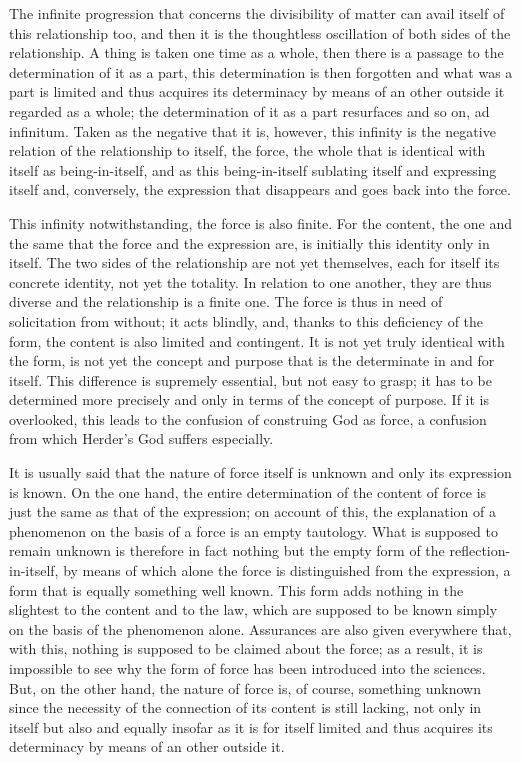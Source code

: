     The infinite progression that concerns
    the divisibility of matter
    can avail itself of this relationship too,
    and then it is the thoughtless oscillation
    of both sides of the relationship.
    A thing is taken one time as a whole,
    then there is a passage to the determination of it as a part,
    this determination is then forgotten
    and what was a part is limited and thus acquires
    its determinacy by means of an other outside it
    regarded as a whole;
    the determination of it as a part resurfaces
    and so on, ad infinitum.
    Taken as the negative that it is, however,
    this infinity is the negative relation of
    the relationship to itself, the force,
    the whole that is identical with itself as being-in-itself,
    and as this being-in-itself sublating itself and expressing itself
    and, conversely, the expression that disappears
    and goes back into the force.

    This infinity notwithstanding,
    the force is also finite.
    For the content, the one and the same
    that the force and the expression are, is
    initially this identity only in itself.
    The two sides of the relationship
    are not yet themselves,
    each for itself its concrete identity,
    not yet the totality.
    In relation to one another, they are thus diverse
    and the relationship is a finite one.
    The force is thus in need of solicitation from without;
    it acts blindly, and, thanks to this deficiency of the form,
    the content is also limited and contingent.
    It is not yet truly identical with the form,
    is not yet the concept and purpose
    that is the determinate in and for itself.
    This difference is supremely essential,
    but not easy to grasp;
    it has to be determined more precisely and
    only in terms of the concept of purpose.
    If it is overlooked, this leads to
    the confusion of construing God as force,
    a confusion from which Herder's God suffers especially.

    It is usually said that the nature of force itself is unknown
    and only its expression is known.
    On the one hand, the entire determination of the content of force is
    just the same as that of the expression;
    on account of this, the explanation of a phenomenon
    on the basis of a force is an empty tautology.
    What is supposed to
    remain unknown is therefore in fact nothing but the empty form
    of the reflection-in-itself, by means of which alone the force is
    distinguished from the expression, a form that is equally
    something well known.
    This form adds nothing in the slightest to the content and to the law,
    which are supposed to be known simply on the basis of the phenomenon alone.
    Assurances are also given everywhere that, with this, nothing is
    supposed to be claimed about the force; as a result, it is impossible to
    see why the form of force has been introduced into the sciences.
    But, on the other hand, the nature of force is, of course, something
    unknown since the necessity of the connection of its content is still
    lacking, not only in itself but also and equally insofar as it is for itself
    limited and thus acquires its determinacy by means of an other outside it.

